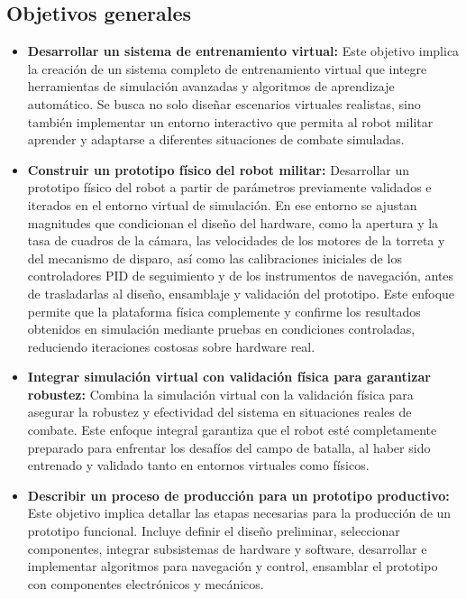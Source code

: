 \subsection{Objetivos generales}
\label{Objetivos generales}

\begin{itemize}
    
    
    \item \textbf{Desarrollar un sistema de entrenamiento virtual:} Este objetivo implica la creación de un sistema completo de entrenamiento virtual que integre herramientas de simulación avanzadas y algoritmos de aprendizaje automático. Se busca no solo diseñar escenarios virtuales realistas, sino también implementar un entorno interactivo que permita al robot militar aprender y adaptarse a diferentes situaciones de combate simuladas.
    
    
    \item \textbf{Construir un prototipo físico del robot militar:} Desarrollar un prototipo físico del robot a partir de parámetros previamente validados e iterados en el entorno virtual de simulación. En ese entorno se ajustan magnitudes que condicionan el diseño del hardware, como la apertura y la tasa de cuadros de la cámara, las velocidades de los motores de la torreta y del mecanismo de disparo, así como las calibraciones iniciales de los controladores PID de seguimiento y de los instrumentos de navegación, antes de trasladarlas al diseño, ensamblaje y validación del prototipo. Este enfoque permite que la plataforma física complemente y confirme los resultados obtenidos en simulación mediante pruebas en condiciones controladas, reduciendo iteraciones costosas sobre hardware real.
    
    
    \item \textbf{Integrar simulación virtual con validación física para garantizar robustez:} Combina la simulación virtual con la validación física para asegurar la robustez y efectividad del sistema en situaciones reales de combate. Este enfoque integral garantiza que el robot esté completamente preparado para enfrentar los desafíos del campo de batalla, al haber sido entrenado y validado tanto en entornos virtuales como físicos.

    \item \textbf{ Describir un proceso de producción para un prototipo productivo:} Este objetivo implica detallar las etapas necesarias para la producción de un prototipo funcional. Incluye definir el diseño preliminar, seleccionar componentes, integrar subsistemas de hardware y software, desarrollar e implementar algoritmos para navegación y control, ensamblar el prototipo con componentes electrónicos y mecánicos.


    
\end{itemize}